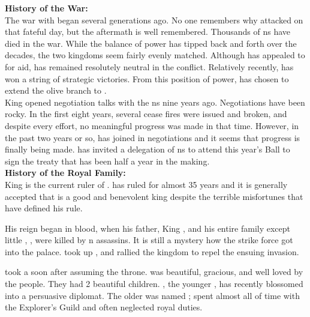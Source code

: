 \documentclass[blue]{NeptuneBall}
\begin{document}
\name{\bAtlantian{}}



{\bf History of the War:}\\
The war with \pPacifica{} began several generations ago. No one remembers why \pPacifica{} attacked on that fateful day, but the aftermath is well remembered. Thousands of \pAtlantis{}ns have died in the war. While the balance of power has tipped back and forth over the decades, the two kingdoms seem fairly evenly matched. Although \pAtlantis{} has appealed to \pIndia{} for aid, \pIndia{} has remained resolutely neutral in the conflict. Relatively recently, \pAtlantis{} has won a string of strategic victories. From this position of power, \cKing{\King} \cKing{} has chosen to extend the olive branch to \pPacifica{}.\\

King \cKing{\MYname{}} opened negotiation talks with the \pPacifica{}ns nine years ago. Negotiations have been rocky. In the first eight years, several cease fires were issued and broken, and despite every effort, no meaningful progress was made in that time. However, in the past two years or so, \cPrincess{\Prince} \cPrincess{} has joined \cPrincess{\their} \cKing{\parent} in negotiations and it seems that progress is finally being made. \cKing{\King} \cKing{} has  invited a delegation of \pPacifica{}ns to attend this year's \cExExKing{} Ball to sign the treaty that has been half a year in the making.\\


{\bf History of the Royal Family:}\\
King \cKing{\MYname{}} is the current ruler of \pAtlantis{}. \cKing{\They} has ruled for almost 35 years and it is generally accepted that \cKing{\they} is a good and benevolent king despite the terrible misfortunes that have defined his rule.

His reign began in blood, when his father, King \cExKing{}, and his entire family except \cKing{\their} little \cPlant{\sibling}, \cPlant{}, were killed by \pPacifica{}n assassins. It is still a mystery how the strike force got into the palace. \cKing{} took up \iTrident{\MYname{}}, and rallied the kingdom to repel the ensuing invasion.

\cKing{\King} \cKing{} took a \cQueen{\spouse} soon after assuming the throne. \cQueen{\King} \cQueen{} was beautiful, gracious, and well loved by the people. They had 2 beautiful children. \cPrincess{\Prince} \cPrincess{}, the younger \cPrincess{\offspring}, has recently blossomed into a persuasive diplomat. The older \cAriel{\Prince} was named \cAriel{}; \cAriel{} spent almost all of \cAriel{\their} time with the Explorer's Guild and often neglected \cAriel{\their} royal duties. 
\end{document}
